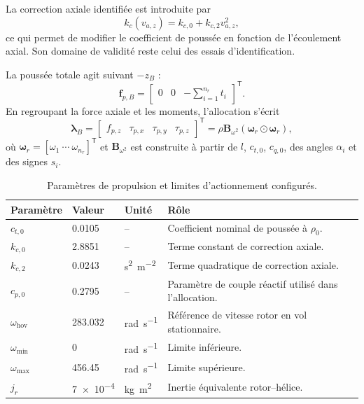 \documentclass[11pt,a4paper,oneside]{report}
\newcommand{\vect}[1]{\bm{#1}}
\newcommand{\mat}[1]{\bm{#1}}
\newcommand{\trans}{^{\mathsf T}}
\newcommand{\had}{\odot}
\begin{document}
	La correction axiale identifiée est introduite par
	\begin{equation}
		k_c(v_{a,z})=k_{c,0}+k_{c,2}v_{a,z}^2,
		\label{eq_axial_correction}
	\end{equation}
	ce qui permet de modifier le coefficient de poussée en fonction de l'écoulement axial. Son domaine de validité reste celui des essais d'identification.
	
	La poussée totale agit suivant $-z_B$ :
	\begin{equation}
		\vect f_{p,B}=\begin{bmatrix}0&0&-\sum_{i=1}^{n_r}t_i\end{bmatrix}\trans.
		\label{eq_total_thrust}
	\end{equation}
	En regroupant la force axiale et les moments, l'allocation s'écrit
	\begin{equation}
		\vect\lambda_B=
		\begin{bmatrix}f_{p,z}&\tau_{p,x}&\tau_{p,y}&\tau_{p,z}\end{bmatrix}\trans
		=\rho\mat B_{\omega^2}\left(\vect\omega_r\had\vect\omega_r\right),
		\label{eq_allocation}
	\end{equation}
	où $\vect\omega_r=[\omega_1\ \cdots\ \omega_{n_r}]\trans$ et $\mat B_{\omega^2}$ est construite à partir de $l$, $c_{t,0}$, $c_{q,0}$, des angles $\alpha_i$ et des signes $s_i$.
	
	\begin{table}[H]
		\centering
		\caption{Paramètres de propulsion et limites d'actionnement configurés.}
		\label{tab_propulsion}
		\begin{tabularx}{\textwidth}{@{}L{4.2cm}L{3.0cm}L{2.6cm}Y@{}}
			\toprule
			\textbf{Paramètre} & \textbf{Valeur} & \textbf{Unité} & \textbf{Rôle}\\
			\midrule
			$c_{t,0}$ & \num{0.0105} & -- & Coefficient nominal de poussée à $\rho_0$.\\
			$k_{c,0}$ & \num{2.8851} & -- & Terme constant de correction axiale.\\
			$k_{c,2}$ & \num{0.0243} & \si{s^2.m^{-2}} & Terme quadratique de correction axiale.\\
			$c_{p,0}$ & \num{0.2795} & -- & Paramètre de couple réactif utilisé dans l'allocation.\\
			$\omega_{\mathrm{hov}}$ & \num{283.032} & \si{rad.s^{-1}} & Référence de vitesse rotor en vol stationnaire.\\
			$\omega_{\min}$ & \num{0} & \si{rad.s^{-1}} & Limite inférieure.\\
			$\omega_{\max}$ & \num{456.45} & \si{rad.s^{-1}} & Limite supérieure.\\
			$j_r$ & \num{7e-4} & \si{kg.m^2} & Inertie équivalente rotor--hélice.\\
			\bottomrule
		\end{tabularx}
	\end{table}
	
\end{document}
